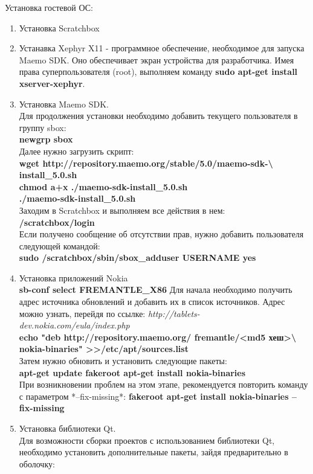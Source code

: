 Установка гостевой ОС:
\begin{enumerate}
\item
Установка Scratchbox
\item
Устанавка Xephyr X11 - программное обеспечение, необходимое для запуска Maemo SDK. Оно обеспечивает экран устройства для разработчика. Имея права суперпользователя (root), выполняем команду \textbf{sudo apt-get install xserver-xephyr}.
\item
Установка Maemo SDK.\\
Для продолжения установки необходимо добавить текущего пользователя в группу sbox:\\
\textbf{newgrp sbox}\\
Далее нужно загрузить скрипт:\\
\textbf{
wget http://repository.maemo.org/stable/5.0/maemo-sdk-\textbackslash\\ install\_5.0.sh\\
chmod a+x ./maemo-sdk-install\_5.0.sh\\
./maemo-sdk-install\_5.0.sh}\\
Заходим в Scratchbox и выполняем все действия в нем:\\
\textbf{/scratchbox/login}\\
Если получено сообщение об отсутствии прав, нужно добавить пользователя следующей командой:\\
\textbf{sudo /scratchbox/sbin/sbox\_adduser USERNAME yes}
\item
Установка приложений Nokia\\
\textbf{sb-conf select FREMANTLE\_X86}
Для начала необходимо получить адрес источника обновлений и добавить их в список источников. Адрес можно узнать, перейдя по ссылке: \textit{http://tablets-dev.nokia.com/eula/index.php}\\
\textbf{echo "deb http://repository.maemo.org/ fremantle/<md5 хеш>\textbackslash\\
nokia-binaries" \textgreater\textgreater /etc/apt/sources.list}\\
Затем нужно обновить и установить следующие пакеты:\\
\textbf{apt-get update
fakeroot apt-get install nokia-binaries}\\
При возникновении проблем на этом этапе, рекомендуется повторить команду с параметром *--fix-missing*:
\textbf{fakeroot apt-get install nokia-binaries --fix-missing}
\item
Установка библиотеки Qt.\\
Для возможности сборки проектов с использованием библиотеки Qt, необходимо установить дополнительные пакеты, зайдя предварительно в оболочку:\\

\end{enumerate}
